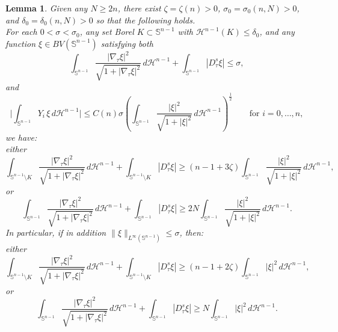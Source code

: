 \documentclass[reqno,11pt]{amsart}
\makeatletter
\def\dz{\delta}
\def\sz{\sigma}
\newtheorem{lem}[thm]{Lemma}%
\numberwithin{equation}{section}
\theoremstyle{remark}
\makeatother
\begin{document}
\begin{lem}\label{spectrum}
Given any $N\ge 2n$, there exist $\zeta=\zeta(n)>0$, $\sz_0=\sz_0(n,N)>0$, and $\delta_0=\delta_0(n,N)>0$ so that the following holds.\\
For each $0<\sz<\sz_0$, any set Borel $K\subset \mathbb S^{n-1}$ with  $\mathscr H^{n-1}(K)\le \dz_0$, and any function $\xi \in BV(\mathbb S^{n-1})$ satisfying both
$$\int_{\mathbb S^{n-1}}  \frac{|\nabla_\tau  \xi|^2}{\sqrt{1+ |\nabla_\tau \xi|^2}} \,d\mathscr H^{n-1}+ \int_{\mathbb S^{n-1}}|D^s_\tau \xi| \le \sz,$$
and
\begin{equation}\label{almost orthogonal general}
\biggl|\int_{\mathbb S^{n-1}} Y_i\,\xi \,d\mathscr H^{n-1}\biggr| \leq C(n)\sigma \left(\int_{\mathbb S^{n-1}} \frac{|\xi|^2}{\sqrt{1+ |\xi|^2}} \,d\mathscr H^{n-1}\right)^{\frac 1 2}\qquad \text{for }i=0,\ldots,n,
\end{equation}
we have:\\
either
$$\int_{\mathbb S^{n-1}\setminus K}  \frac{|\nabla_\tau  \xi|^2}{\sqrt{1+ |\nabla_\tau \xi|^2}} \,d\mathscr H^{n-1} + \int_{\mathbb S^{n-1}\setminus K}|D^s_\tau \xi|\geq  \left(n-1+3 \zeta\right)  \int_{\mathbb S^{n-1}} \frac{|\xi|^2}{\sqrt{1+ |\xi|^2}} \,d\mathscr H^{n-1},$$ 
or
$$\int_{\mathbb S^{n-1}}  \frac{|\nabla_\tau  \xi|^2}{\sqrt{1+ |\nabla_\tau \xi|^2}} \,d\mathscr H^{n-1} + \int_{\mathbb S^{n-1}}|D^s_\tau \xi|\geq 2N  \int_{\mathbb S^{n-1}} \frac{|\xi|^2}{\sqrt{1+ |\xi|^2}} \,d\mathscr H^{n-1}.$$
In particular, if in addition $\|\xi\|_{L^{\infty}(\mathbb S^{n-1})}\le \sz$, then:\\
either
$$ \int_{\mathbb S^{n-1}\setminus K}  \frac{|\nabla_\tau  \xi|^2}{\sqrt{1+ |\nabla_\tau \xi|^2}} \,d\mathscr H^{n-1}+ \int_{\mathbb S^{n-1}\setminus K}|D^s_\tau \xi| \geq  \left(n-1+2 \zeta\right) \int_{\mathbb S^{n-1}} |\xi|^2 \,d\mathscr H^{n-1},$$ 
or
$$\int_{\mathbb S^{n-1}}  \frac{|\nabla_\tau  \xi|^2}{\sqrt{1+ |\nabla_\tau \xi|^2}} \,d\mathscr H^{n-1} + \int_{\mathbb S^{n-1}}|D^s_\tau \xi|\geq N  \int_{\mathbb S^{n-1}} |\xi|^2 \,d\mathscr H^{n-1}.$$
\end{lem}
\end{document}
